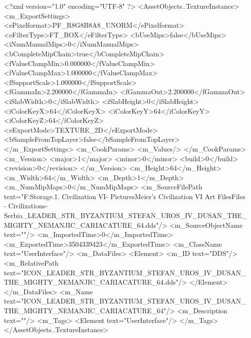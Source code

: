 <?xml version="1.0" encoding="UTF-8" ?>
<AssetObjects..TextureInstance>
	<m_ExportSettings>
		<ePixelformat>PF_R8G8B8A8_UNORM</ePixelformat>
		<eFilterType>FT_BOX</eFilterType>
		<bUseMips>false</bUseMips>
		<iNumManualMips>0</iNumManualMips>
		<bCompleteMipChain>true</bCompleteMipChain>
		<fValueClampMin>0.000000</fValueClampMin>
		<fValueClampMax>1.000000</fValueClampMax>
		<fSupportScale>1.000000</fSupportScale>
		<fGammaIn>2.200000</fGammaIn>
		<fGammaOut>2.200000</fGammaOut>
		<iSlabWidth>0</iSlabWidth>
		<iSlabHeight>0</iSlabHeight>
		<iColorKeyX>64</iColorKeyX>
		<iColorKeyY>64</iColorKeyY>
		<iColorKeyZ>64</iColorKeyZ>
		<eExportMode>TEXTURE_2D</eExportMode>
		<bSampleFromTopLayer>false</bSampleFromTopLayer>
	</m_ExportSettings>
	<m_CookParams>
		<m_Values/>
	</m_CookParams>
	<m_Version>
		<major>1</major>
		<minor>0</minor>
		<build>0</build>
		<revision>0</revision>
	</m_Version>
	<m_Height>64</m_Height>
	<m_Width>64</m_Width>
	<m_Depth>1</m_Depth>
	<m_NumMipMaps>0</m_NumMipMaps>
	<m_SourceFilePath text="F:\Mod Storage\2.1. Civilization VI\Mods\Archive - Pictures\Sid Meier's Civilization VI Art Files\Art Files - Civilizations\Civilization - Serbia\ICON_LEADER_STR_BYZANTIUM_STEFAN_UROS_IV_DUSAN_THE_MIGHTY_NEMANJIC_CARIACATURE_64.dds"/>
	<m_SourceObjectName text=""/>
	<m_ImportedTime>0</m_ImportedTime>
	<m_ExportedTime>3504339423</m_ExportedTime>
	<m_ClassName text="UserInterface"/>
	<m_DataFiles>
		<Element>
			<m_ID text="DDS"/>
			<m_RelativePath text="ICON_LEADER_STR_BYZANTIUM_STEFAN_UROS_IV_DUSAN_THE_MIGHTY_NEMANJIC_CARIACATURE_64.dds"/>
		</Element>
	</m_DataFiles>
	<m_Name text="ICON_LEADER_STR_BYZANTIUM_STEFAN_UROS_IV_DUSAN_THE_MIGHTY_NEMANJIC_CARIACATURE_64"/>
	<m_Description text=""/>
	<m_Tags>
		<Element text="UserInterface"/>
	</m_Tags>
</AssetObjects..TextureInstance>


